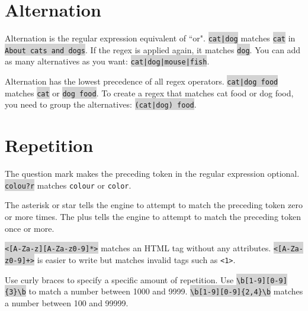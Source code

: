 
\chapter{Alternation}


Alternation is the regular expression equivalent of ``or". \colorbox{lightgray}{\texttt{cat|dog}} matches \colorbox{lightgray}{\texttt{cat}} in \colorbox{lightgray}{\texttt{About cats and dogs}}. If the regex is applied again, it matches \colorbox{lightgray}{\texttt{dog}}. You can add as many alternatives as you want: \colorbox{lightgray}{\texttt{cat|dog|mouse|fish}}.

Alternation has the lowest precedence of all regex operators. \colorbox{lightgray}{\texttt{cat|dog food}} matches \colorbox{lightgray}{\texttt{cat}} or \colorbox{lightgray}{\texttt{dog food}}. To create a regex that matches cat food or dog food, you need to group the alternatives: \colorbox{lightgray}{\texttt{(cat|dog) food}}.



\chapter{Repetition}


The question mark makes the preceding token in the regular expression optional. \colorbox{lightgray}{\texttt{colou?r}} matches \texttt{colour} or \texttt{color}.


The asterisk or star tells the engine to attempt to match the preceding token zero or more times. The plus tells the engine to attempt to match the preceding token once or more. 

\colorbox{lightgray}{\texttt{<[A-Za-z][A-Za-z0-9]*>}} matches an HTML tag without any attributes. \colorbox{lightgray}{\texttt{<[A-Za-z0-9]+>}} is easier to write but matches invalid tags such as \texttt{<1>}.

Use curly braces to specify a specific amount of repetition. Use \colorbox{lightgray}{\texttt{\textbackslash b[1-9][0-9]\{3\}\textbackslash b}} to match a number between 1000 and 9999. \colorbox{lightgray}{\texttt{\textbackslash b[1-9][0-9]\{2,4\}\textbackslash b}} matches a number between 100 and 99999.






